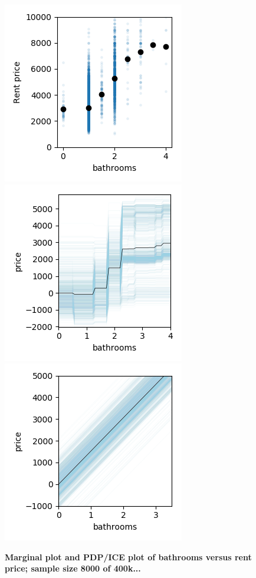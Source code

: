\documentclass[12pt]{article}
\begin{document}
\begin{figure}[htbp]
\begin{center}
\includegraphics[scale=0.7]{images/bathrooms_vs_price.png}
\includegraphics[scale=0.7]{images/bathrooms_vs_price_pdp.png}
\includegraphics[scale=0.7]{images/bathrooms_vs_price_pdp_lm.png}
\caption{{\bf  Marginal plot and PDP/ICE plot of bathrooms versus rent price; sample size 8000 of 400k...}}
\label{fig:baths_price}
\end{center}
\end{figure}
\end{document}
